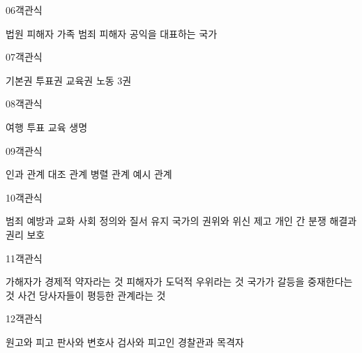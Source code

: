 \documentclass[fs9,seriesRus]{korfarm-base}
\begin{document}
\begin{kfQBlock}{06}{객관식}
\begin{kfChoices}
\kfChoice 법원
\kfChoice 피해자 가족
\kfChoice 범죄 피해자
\kfChoice 공익을 대표하는 국가
\end{kfChoices}
\end{kfQBlock}
\begin{kfQBlock}{07}{객관식}
\begin{kfChoices}
\kfChoice 기본권
\kfChoice 투표권
\kfChoice 교육권
\kfChoice 노동 3권
\end{kfChoices}
\end{kfQBlock}
\begin{kfQBlock}{08}{객관식}
\begin{kfChoices}
\kfChoice 여행
\kfChoice 투표
\kfChoice 교육
\kfChoice 생명
\end{kfChoices}
\end{kfQBlock}
\begin{kfQBlock}{09}{객관식}
\begin{kfChoices}
\kfChoice 인과 관계
\kfChoice 대조 관계
\kfChoice 병렬 관계
\kfChoice 예시 관계
\end{kfChoices}
\end{kfQBlock}
\begin{kfQBlock}{10}{객관식}
\begin{kfChoices}
\kfChoice 범죄 예방과 교화
\kfChoice 사회 정의와 질서 유지
\kfChoice 국가의 권위와 위신 제고
\kfChoice 개인 간 분쟁 해결과 권리 보호
\end{kfChoices}
\end{kfQBlock}
\begin{kfQBlock}{11}{객관식}
\begin{kfChoices}
\kfChoice 가해자가 경제적 약자라는 것
\kfChoice 피해자가 도덕적 우위라는 것
\kfChoice 국가가 갈등을 중재한다는 것
\kfChoice 사건 당사자들이 평등한 관계라는 것
\end{kfChoices}
\end{kfQBlock}
\begin{kfQBlock}{12}{객관식}
\begin{kfChoices}
\kfChoice 원고와 피고
\kfChoice 판사와 변호사
\kfChoice 검사와 피고인
\kfChoice 경찰관과 목격자
\end{kfChoices}
\end{kfQBlock}
\end{document}

